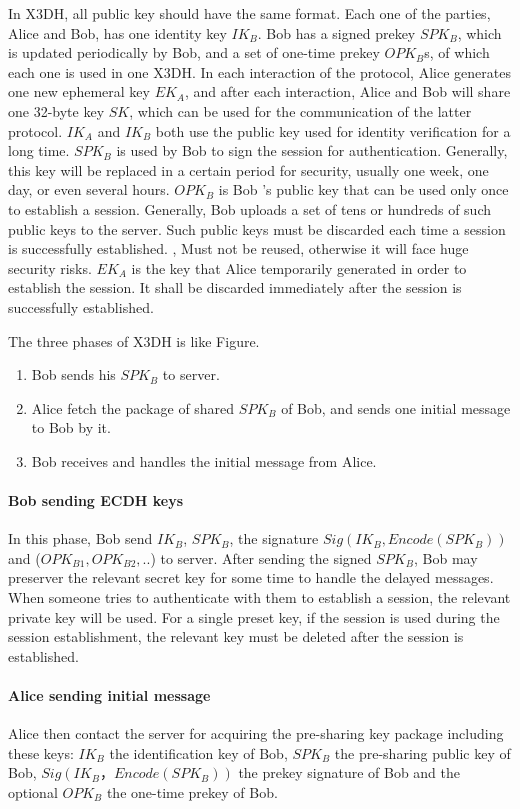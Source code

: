 \documentclass[11pt,en]{elegantpaper}
\begin{document}
In X3DH, all public key should have the same format. Each one of the parties, Alice and Bob, has one identity key $IK_B$. Bob has a signed prekey $SPK_B$, which is updated periodically by Bob, and a set of one-time prekey $OPK_B$s, of which each one is used in one X3DH. In each interaction of the protocol, Alice generates one new ephemeral key $EK_A$, and after each interaction, Alice and Bob will share one 32-byte key $SK$, which can be used for the communication of the latter protocol. $IK_A$ and $IK_B$ both use the public key used for identity verification for a long time. $SPK_B$ is used by Bob to sign the session for authentication. Generally, this key will be replaced in a certain period for security, usually one week, one day, or even several hours. $OPK_B$ is Bob ’s public key that can be used only once to establish a session. Generally, Bob uploads a set of tens or hundreds of such public keys to the server. Such public keys must be discarded each time a session is successfully established. , Must not be reused, otherwise it will face huge security risks. $EK_A$ is the key that Alice temporarily generated in order to establish the session. It shall be discarded immediately after the session is successfully established.

The three phases of X3DH is like Figure.

\begin{enumerate}
    \item Bob sends his $SPK_B$ to server.
    \item Alice fetch the package of shared $SPK_B$ of Bob, and sends one initial message to Bob by it.
    \item Bob receives and handles the initial message from Alice.
\end{enumerate}

\paragraph{Bob sending ECDH keys}
In this phase, Bob send $IK_B$, $SPK_B$, the signature $Sig(IK_B, Encode(SPK_B))$ and ($OPK_{B1}, OPK_{B2},..$) to server. After sending the signed $SPK_B$, Bob may preserver the relevant secret key for some time to handle the delayed messages. When someone tries to authenticate with them to establish a session, the relevant private key will be used. For a single preset key, if the session is used during the session establishment, the relevant key must be deleted after the session is established.

\paragraph{Alice sending initial message}
Alice then contact the server for acquiring the pre-sharing key package including these keys: $IK_B$ the identification key of Bob, $SPK_B$ the pre-sharing public key of Bob, $Sig(IK_B，Encode(SPK_B))$ the prekey signature of Bob and the optional $OPK_B$ the one-time prekey of Bob.
\end{document}
